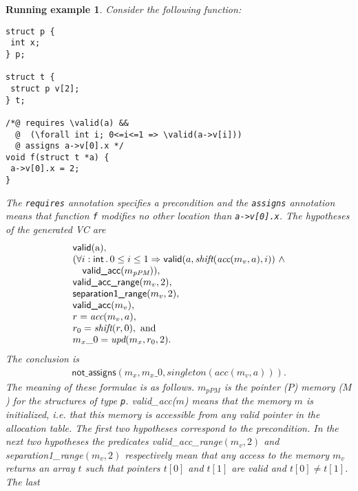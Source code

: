 \documentclass{acm_proc_article-sp}
\theoremstyle{nonumberplain}
\newtheorem{xpl}{Running example}}
\newcommand{\valid}[0]{\ensuremath{\mathsf{valid}}}
\begin{document}
\begin{xpl}
Consider the following function:
\begin{verbatim}
struct p {
 int x;
} p;

struct t {
 struct p v[2];	 
} t;

/*@ requires \valid(a) &&
  @  (\forall int i; 0<=i<=1 => \valid(a->v[i]))
  @ assigns a->v[0].x */
void f(struct t *a) {
 a->v[0].x = 2;
}
\end{verbatim}
The \texttt{requires} annotation specifies a
precondition and the \texttt{assigns} annotation means that function
\texttt{f} modifies no other location than \verb+a->v[0].x+.
The hypotheses of the generated VC are
\begin{displaymath}
\begin{array}{l}
\textsf{valid}($a$),\\
(\forall i:\textsf{int} \,.\, 0 \leq i \leq 1
\Rightarrow \textsf{valid}(a,\textit{shift}(\textit{acc}(m_v,a),i)) 
\ \land  \nonumber \\
\quad \textsf{valid\_acc}(m_{\textit{pPM}})),\\
\textsf{valid\_acc\_range}(m_v,2),\\
\textsf{separa\-tion1\_ran\-ge}(m_v,2),\\
\textsf{va\-lid\_acc}(m_v),\\
r = \textit{acc}(m_v,a),\\
r_0 = \textit{shift}(r,0), \textrm{ and } \\
m_x\_0 = \textit{upd}(m_x,r_0,2).
\end{array}
\end{displaymath}
The conclusion is
\begin{equation*}
\begin{array}{l}
\textsf{not\_assigns}(
 m_x,
 m_x\_0,
 \textit{singleton}(
   \textit{acc}(  
      m_v, 
      a
   )
 )
).
\end{array} 
\end{equation*}
The meaning of these formulae is as follows. $m_{\textit{pPM}}$ is the
pointer ($P$) memory ($M$) for the structures of type \texttt{p}.
\textsf{valid\_\-acc}($m$) means that the memory $m$ is initialized,
i.e. that this memory is accessible from any valid pointer in the
allocation table. The first two hypotheses correspond to the
precondition. In the next two hypotheses the predi\-cates
\textsf{valid\_acc\_range}$(m_v,2)$ and
\textsf{separation1}\_\textsf{range}$(m_v,2)$ respectively mean that
any access to the memory $m_v$ returns an array $t$ such that
poin\-ters $t[0]$ and $t[1]$ are valid and $t[0] \neq t[1]$.  The last

\end{xpl}
\end{document}
